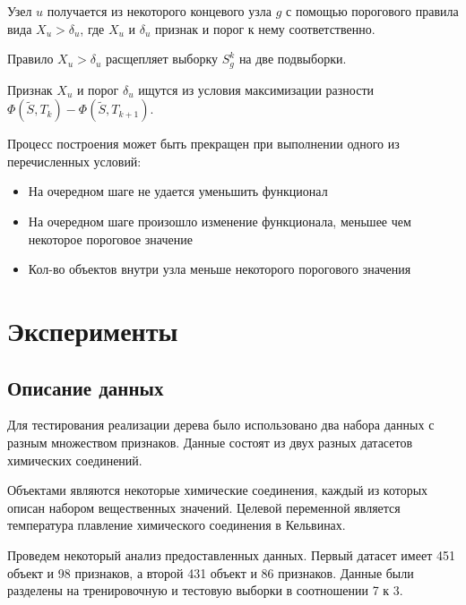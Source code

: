 \documentclass{article}
\begin{document}
Узел $u$ получается из некоторого концевого узла $g$ с помощью порогового правила вида $X_u > \delta_u$, где $X_u$ и $\delta_u$ признак и порог к нему соответственно. 

Правило $X_u > \delta_u$ расщепляет выборку $S_g^k$ на две подвыборки.

Признак $X_u$ и порог $\delta_u$ ищутся из условия максимизации разности $\Phi(\tilde{S}, T_k) - \Phi(\tilde{S}, T_{k + 1})$.

Процесс построения может быть прекращен при выполнении одного из перечисленных условий:

\begin{itemize}
	\item На очередном шаге не удается уменьшить функционал
	\item На очередном шаге произошло изменение функционала, меньшее чем некоторое пороговое значение
	\item Кол-во объектов внутри узла меньше некоторого порогового значения
\end{itemize}




\section{Эксперименты}

\subsection{Описание данных}

Для тестирования реализации дерева было использовано два набора данных с разным множеством признаков. Данные состоят из двух разных датасетов химических соединений.

Объектами являются некоторые химические соединения, каждый из которых описан набором вещественных значений. Целевой переменной является температура плавление химического соединения в Кельвинах.

Проведем некоторый анализ предоставленных данных. Первый датасет имеет 451 объект и 98 признаков, а второй 431 объект и 86 признаков. Данные были разделены на тренировочную и тестовую выборки в соотношении 7 к 3.
\end{document}
